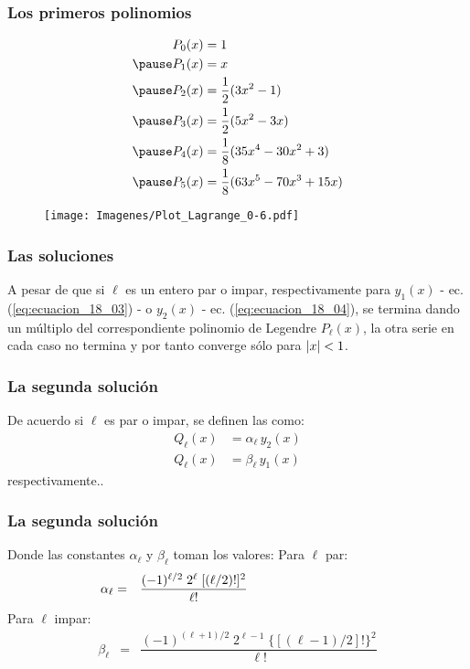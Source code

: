 \documentclass[12pt]{beamer}
\begin{document}
\begin{frame}
\frametitle{Los primeros polinomios}
\begin{eqnarray*}
\begin{aligned}
P_{0} (x) &= 1 \\ \pause
P_{1} (x) &= x  \\ \pause
P_{2} (x) &= \dfrac{1}{2} (3 x^{2} - 1) \\ \pause
P_{3} (x) &= \dfrac{1}{2} (5 x^{2} - 3 x) \\ \pause
P_{4} (x) &= \dfrac{1}{8} (35 x^{4} - 30 x^{2} + 3) \\ \pause
P_{5} (x) &= \dfrac{1}{8} (63 x^{5} - 70 x^{3} + 15 x)
\end{aligned}
\end{eqnarray*}
\end{frame}
\begin{frame}[plain]
\begin{figure}
    \centering
    \texttt{[image: Imagenes/Plot\_Lagrange\_0-6.pdf]}
\end{figure}
\end{frame}
\begin{frame}
\frametitle{Las soluciones}
A pesar de que si $\ell$ es un entero par o impar, respectivamente para $y_{1} (x)$ - ec. (\ref{eq:ecuacion_18_03}) - o $y_{2} (x)$ - ec. (\ref{eq:ecuacion_18_04}), \pause se termina dando un múltiplo del correspondiente polinomio de Legendre $P_{\ell} (x)$, \pause la otra serie en cada caso no termina y por tanto converge sólo para $\abs{x} < 1$.
\end{frame}
\begin{frame}
\frametitle{La segunda solución}
De acuerdo si $\ell$ es par o impar, \pause se definen las  como:
\pause
\begin{align*}
Q_{\ell} (x) &=  \alpha_{\ell} \, y_{2} (x) \\
Q_{\ell} (x) &= \beta_{\ell} \, y_{1}(x)
\end{align*}
respectivamente..
\end{frame}
\begin{frame}
\frametitle{La segunda solución}
Donde las constantes $\alpha_{\ell}$ y $\beta_{\ell}$ toman los valores:
\pause
Para $\ell$ par:
\begin{align}
\alpha_{\ell} &=& \dfrac{(-1)^{\ell/2} \; 2^{\ell} \; [(\ell / 2)!]^{2}}{\ell!} \hspace{3.5cm}  \label{eq:ecuacion_18_05}
\end{align}
\pause
Para $\ell$ impar:
\begin{align}
\beta_{\ell} &=& \dfrac{(-1)^{(\ell + 1)/2} \; 2^{\ell - 1} \; \lbrace \left[ (\ell - 1) /2 \right] ! \rbrace^{2}}{\ell!} \label{eq:ecuacion_18_06}
\end{align}
\end{frame}
\end{document}

